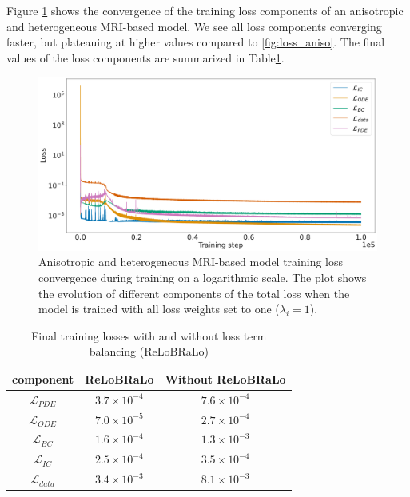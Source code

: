 Figure \ref{fig:loss_aniso_no_relobralo} shows the convergence of the training loss components of an anisotropic and heterogeneous MRI-based model. We see all loss components converging faster, but plateauing at higher values compared to \ref{fig:loss_aniso}. The final values of the loss components are summarized in Table\ref{tab:no_relobralo}.
\begin{figure}[H]
  \centering
  \includegraphics[width=\linewidth]{Figs/Anisotropic/loss_aniso_no_relobralo.pdf}
  \caption{Anisotropic and heterogeneous MRI-based model training loss convergence during training on a logarithmic scale. The plot shows the evolution of different components of the total loss when the model is trained with all loss weights set to one  ($\lambda_i=1$).}
  \label{fig:loss_aniso_no_relobralo}
\end{figure}

\begin{table}[h]
  \centering
  \begin{tabular}{|c|c|c|}
    \hline
    component & ReLoBRaLo & Without ReLoBRaLo  \\ \hline
    $\mathcal{L}_{PDE}$  & $3.7\times 10^{-4}$  & $7.6\times 10^{-4}$   \\ \hline
    $\mathcal{L}_{ODE}$  & $7.0\times 10^{-5}$   & $2.7\times 10^{-4}$   \\ \hline
    $\mathcal{L}_{BC}$  & $1.6\times 10^{-4}$   & $1.3\times 10^{-3}$  \\ \hline
    $\mathcal{L}_{IC}$  & $2.5\times 10^{-4}$  & $3.5\times 10^{-4}$ \\ \hline
    $\mathcal{L}_{data}$ & $3.4\times 10^{-3}$  & $8.1\times 10^{-3}$  \\ \hline
    
  \end{tabular}
  \caption{Final training losses with and without loss term balancing (ReLoBRaLo)}
  \label{tab:no_relobralo}
\end{table}

